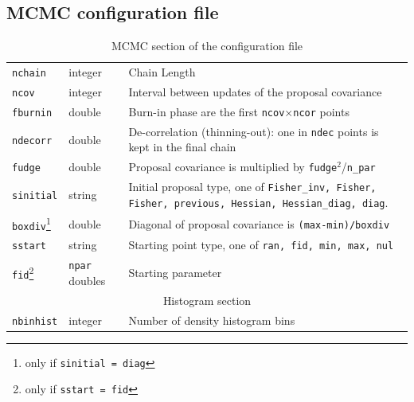\documentclass[11pt, chapterprefix, headsepline]{scrartcl}
\newcommand{\onlyif}[2]{\footnote{only if \texttt{#1 =\; #2}}}
\begin{document}
\begin{appendix}
\subsection{MCMC configuration file}


\begin{table}
  \caption{MCMC section of the configuration file}
  \label{tab:MCMC}

\begin{minipage}{\textwidth}
  \begin{tabular}{llp{\spaltedrei}} \hline\hline
    \texttt{nchain}  & integer & Chain Length\\
    \texttt{ncov}    & integer & Interval between updates of the proposal covariance \\
    \texttt{fburnin} & double & Burn-in phase are the first
                       \texttt{ncov}$\times$\texttt{ncor} points\\
    \texttt{ndecorr} & double & De-correlation (thinning-out): one in
    \texttt{ndec} points is kept in the final chain\\
    \texttt{fudge}   & double & Proposal covariance is multiplied by
    \texttt{fudge$^2$}/\texttt{n\_par} \\
    \texttt{sinitial} & string & Initial proposal type, one of
    \texttt{Fisher\_inv, Fisher, Fisher, previous, Hessian,
      Hessian\_diag, diag}. \\
    \texttt{boxdiv}\onlyif{sinitial}{diag} & double & Diagonal of proposal covariance is 
    \texttt{(max-min)/boxdiv} \\
    \texttt{sstart} & string & Starting point type, one of \texttt{ran,
      fid, min, max, nul} \\
    \texttt{fid}\onlyif{sstart}{fid} & \texttt{npar} doubles & Starting parameter \\
    \hline
    \multicolumn{3}{c}{Histogram section} \\
    \hline
    \texttt{nbinhist} & integer & Number of density histogram bins \\ \hline\hline
  \end{tabular}
\end{minipage}

\end{table}




\end{appendix}
\end{document}
